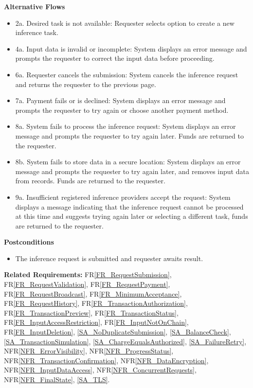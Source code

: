 \documentclass[12pt]{article}
\newcommand{\rref}[1]{FR\ref{#1}}
\newcommand{\nfrref}[1]{NFR\ref{#1}}
\begin{document}
\textbf{Alternative Flows}
\begin{itemize}
\item 2a. Desired task is not available: Requester selects option to create a new inference task.
\item 4a. Input data is invalid or incomplete: System displays an error message and prompts the requester to correct the input data before proceeding.
\item 6a. Requester cancels the submission: System cancels the inference request and returns the requester to the previous page.
\item 7a. Payment fails or is declined: System displays an error message and prompts the requester to try again or choose another payment method.
\item 8a. System fails to process the inference request: System displays an error message and prompts the requester to try again later. Funds are returned to the requester.
\item 8b. System fails to store data in a secure location: System displays an error message and prompts the requester to try again later, and removes input data from records. Funds are returned to the requester.
\item 9a. Insufficient registered inference providers accept the request: System displays a message indicating that the inference request cannot be processed at this time and suggests trying again later or selecting a different task, funds are returned to the requester.
\end{itemize}

\textbf{Postconditions}
\begin{itemize}
\item The inference request is submitted and requester awaits result.
\end{itemize}

\textbf{Related Requirements:} \rref{FR_RequestSubmission}, \rref{FR_RequestValidation}, \rref{FR_RequestPayment}, \rref{FR_RequestBroadcast}, \rref{FR_MinimumAcceptance}, \rref{FR_RequestHistory}, \rref{FR_TransactionAuthorization}, \rref{FR_TransactionPreview}, \rref{FR_TransactionStatus}, \rref{FR_InputAccessRestriction}, \rref{FR_InputNotOnChain}, \rref{FR_InputDeletion}, \ref{SA_NoDuplicateSubmission}, \ref{SA_BalanceCheck}, \ref{SA_TransactionSimulation}, \ref{SA_ChargeEqualsAuthorized}, \ref{SA_FailureRetry}, \nfrref{NFR_ErrorVisibility}, \nfrref{NFR_ProgressStatus}, \nfrref{NFR_TransactionConfirmation}, \nfrref{NFR_DataEncryption}, \nfrref{NFR_InputDataAccess}, \nfrref{NFR_ConcurrentRequests}, \nfrref{NFR_FinalState}, \ref{SA_TLS}.
\end{document}
